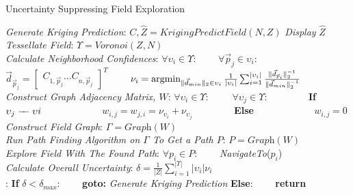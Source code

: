 \begin{algorithm}[thpb!]
\caption{Uncertainty Suppressing Field Exploration}\label{alg:uncert}
\begin{algorithmic}[2]
    \BState \emph{Generate Kriging Prediction}:
    \State $C, \hat{Z} = \textit{KrigingPredictField}(N,Z)$
    \State \textit{Display} $\hat{Z}$\\
    \BState \emph{Tessellate Field}:
    \State $\Upsilon = \textit{Voronoi}(Z, N)$\\
    \BState \emph{Calculate Neighborhood Confidences}:
    \State $\forall \upsilon_i \in \Upsilon$:
    \State \ \ \ \ $\forall \vec{p}_j \in \upsilon_i$:
    \State \ \ \ \ \ \ \ \ $\vec{d}_{\vec{p}_j} = \begin{bmatrix} C_{1,\vec{p}_j} \dots C_{n,\vec{p}_j} \end{bmatrix}^T$
    \State \ \ \ \ $\nu_i = \operatornamewithlimits{argmin}_{\| \vec{d}_{min} \|_2 \in \upsilon_i} \frac{1}{|\upsilon_i|} \large\sum_{i = 1}^{|\upsilon_i|} \frac{\| \vec{d}_{\vec{p}_i} \|_{2}^{-1}} {\| \vec{d}_{min} \|_2^{-1}}$\\
    \BState \emph{Construct Graph Adjacency Matrix, $W$}:
    \State $\forall \upsilon_i \in \Upsilon:$
    \State \ \ \ \ $\forall \upsilon_j \in \Upsilon$:
    \State \ \ \ \ \ \ \ \ \textbf{If} {$\upsilon_j \edge \upsilon{i}$}
    \State \ \ \ \ \ \ \ \ \ \ \ \  $w_{i,j} = w_{j,i} = \nu_{\upsilon_i} + \nu_{\upsilon_j}$
    \State \ \ \ \ \ \ \ \ \textbf{Else}
    \State \ \ \ \ \ \ \ \ \ \ \ \  $w_{i,j} = 0$\\
    \BState \emph{Construct Field Graph}:
    \State $\Gamma = \textit{Graph}(W)$\\
    \BState \emph{Run Path Finding Algorithm on $\Gamma$ To Get a Path $P$}:
    \State $P = \textit{Graph}(W)$\\
    \BState \emph{Explore Field With The Found Path}:
    \State $\forall p_i \in P$:
    \State \ \ \ \ \textit{NavigateTo}($p_i$)\\
    \BState \emph{Calculate Overall Uncertainty}:
    \State $\delta = \frac{1}{|Z|} \sum_{i = 1}^{|\Upsilon|} |\upsilon_i| \nu_i$\\
    :
    \State \textbf{If} $\delta < \delta_{max}$:
    \State \ \ \ \ \textbf{goto:} \textit{Generate Kriging Prediction}
    \State \textbf{Else}:
    \State \ \ \ \ \textbf{return}
\EndProcedure
\end{algorithmic}
\end{algorithm}